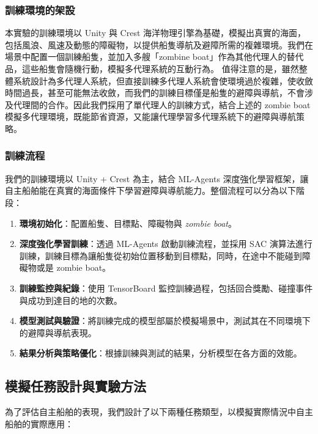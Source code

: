\documentclass[12pt,a4paper]{article}
\begin{document}
\subsubsection{訓練環境的架設}
本實驗的訓練環境以 Unity 與 Crest 海洋物理引擎為基礎，模擬出真實的海面，包括風浪、風速及動態的障礙物，以提供船隻導航及避障所需的複雜環境。我們在場景中配置一個訓練船隻，並加入多艘「zombine boat」作為其他代理人的替代品，這些船隻會隨機行動，模擬多代理系統的互動行為。
值得注意的是，雖然整體系統設計為多代理人系統，但直接訓練多代理人系統會使環境過於複雜，使收斂時間過長，甚至可能無法收斂，而我們的訓練目標僅是船隻的避障與導航，不會涉及代理間的合作。因此我們採用了單代理人的訓練方式，結合上述的 zombie boat 模擬多代理環境，既能節省資源，又能讓代理學習多代理系統下的避障與導航策略。

\subsubsection{訓練流程}
我們的訓練環境以 Unity + Crest 為主，結合 ML-Agents 深度強化學習框架，讓自主船舶能在真實的海面條件下學習避障與導航能力。整個流程可以分為以下階段：
\begin{enumerate}
    \item \textbf{環境初始化}：配置船隻、目標點、障礙物與 \textit{zombie boat}。
    \item \textbf{深度強化學習訓練}：透過 ML-Agents 啟動訓練流程，並採用 SAC 演算法進行訓練，訓練目標為讓船隻從初始位置移動到目標點，同時，在途中不能碰到障礙物或是 zombie boat。
    \item \textbf{訓練監控與紀錄}：使用 TensorBoard 監控訓練過程，包括回合獎勵、碰撞事件與成功到達目的地的次數。
    \item \textbf{模型測試與驗證}：將訓練完成的模型部屬於模擬場景中，測試其在不同環境下的避障與導航表現。
    \item \textbf{結果分析與策略優化}：根據訓練與測試的結果，分析模型在各方面的效能。
\end{enumerate}

\subsection{模擬任務設計與實驗方法}
為了評估自主船舶的表現，我們設計了以下兩種任務類型，以模擬實際情況中自主船舶的實際應用：
\end{document}
